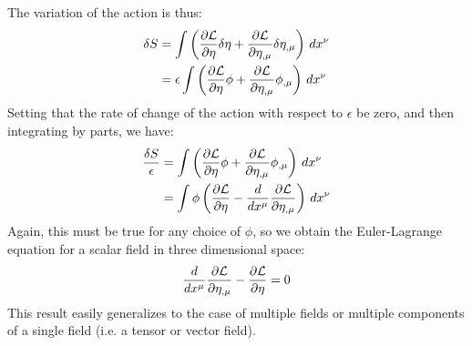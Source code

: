 The variation of the action is thus:
\begin{align}
\delta S&=\int\left(\frac{\partial \mathcal{L}}{\partial \eta}\delta\eta+\frac{\partial \mathcal{L}}{\partial \eta_{,\mu}}\delta\eta_{,\mu}\right)\,dx^\nu\nonumber\\
&=\epsilon\int\left(\frac{\partial \mathcal{L}}{\partial \eta}\phi+\frac{\partial \mathcal{L}}{\partial \eta_{,\mu}}\phi_{,\mu}\right)\,dx^\nu
\end{align}
Setting that the rate of change of the action with respect to $\epsilon$ be zero, and then integrating by parts, we have:
\begin{align}
\frac{\delta S}{\epsilon}&=\int\left(\frac{\partial \mathcal{L}}{\partial \eta}\phi+\frac{\partial \mathcal{L}}{\partial \eta_{,\mu}}\phi_{,\mu}\right)\,dx^\nu\nonumber\\
&=\int\phi\left(\frac{\partial \mathcal{L}}{\partial \eta}-\frac{d}{dx^\mu}\frac{\partial \mathcal{L}}{\partial \eta_{,\mu}}\right)\,dx^\nu\nonumber
\end{align}
Again, this must be true for any choice of $\phi$, so we obtain the Euler-Lagrange equation for a scalar field in three dimensional space:
\begin{align}
\frac{d}{dx^\mu}\frac{\partial \mathcal{L}}{\partial \eta_{,\mu}}-\frac{\partial \mathcal{L}}{\partial \eta}=0
\end{align}
This result easily generalizes to the case of multiple fields or multiple components of a single field (i.e. a tensor or vector field).
